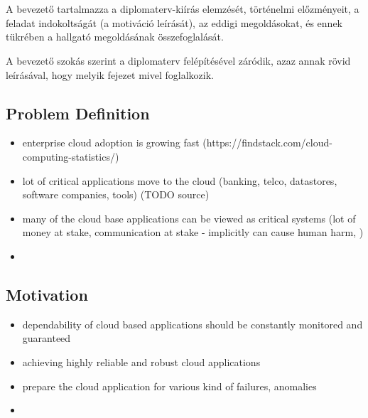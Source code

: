 \chapter{\bevezetes}

A bevezető tartalmazza a diplomaterv-kiírás elemzését, történelmi előzményeit, a feladat indokoltságát (a motiváció leírását), az eddigi megoldásokat, és ennek tükrében a hallgató megoldásának összefoglalását.

A bevezető szokás szerint a diplomaterv felépítésével záródik, azaz annak rövid leírásával, hogy melyik fejezet mivel foglalkozik.

\section{Problem Definition}

\begin{itemize}
	\item enterprise cloud adoption is growing fast (https://findstack.com/cloud-computing-statistics/)
	\item lot of critical applications move to the cloud (banking, telco, datastores, software companies, tools) (TODO source)
	\item many of the cloud base applications can be viewed as critical systems (lot of money at stake, communication at stake - implicitly can cause human harm, \etc)
	\item \etc
\end{itemize}

\section{Motivation}

\begin{itemize}
	\item dependability of cloud based applications should be constantly monitored and guaranteed
	\item achieving highly reliable and robust cloud applications
	\item prepare the cloud application for various kind of failures, anomalies
	\item \etc
\end{itemize}

